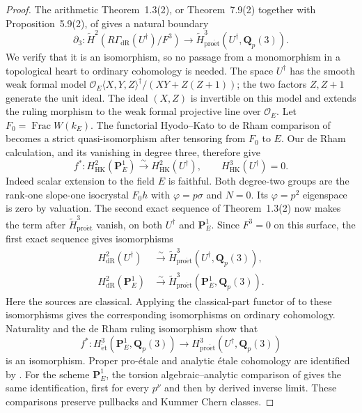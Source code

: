 \documentclass[11pt,a4paper]{amsart}
\numberwithin{equation}{section}
\theoremstyle{definition}
\theoremstyle{remark}
\newcommand{\Q}{\mathbf Q}
\newcommand{\PP}{\mathbf P}
\newcommand{\OO}{\mathcal O}
\newcommand{\Frac}{\operatorname{Frac}}
\begin{document}
\begin{proof}
The arithmetic Theorem~1.3(2), or Theorem~7.9(2) together with Proposition~5.9(2), of \cite{ColmezNiziol} gives a natural boundary
\[
\partial_3:\widetilde H^2(R\Gamma_{\mathrm{dR}}(U^\dagger)/F^3)
\longrightarrow\widetilde H^3_{\mathrm{pro\acute et}}(U^\dagger,\Q_p(3)).
\]
We verify that it is an isomorphism, so no passage from a monomorphism in a topological heart to ordinary cohomology is needed. The space $U^\dagger$ has the smooth weak formal model
$\OO_E\langle X,Y,Z\rangle^\dagger/(XY+Z(Z+1))$; the two factors $Z,Z+1$ generate the unit ideal. The ideal $(X,Z)$ is invertible on this model and extends the ruling morphism to the weak formal projective line over $\OO_E$. Let $F_0=\Frac W(k_E)$. The functorial Hyodo--Kato to de Rham comparison of \cite[equation~(5.4) and Propositions~5.5--5.6]{ColmezNiziol} becomes a strict quasi-isomorphism after tensoring from $F_0$ to $E$. Our de Rham calculation, and its vanishing in degree three, therefore give
\[
f^*:H^2_{\mathrm{HK}}(\PP^1_E)\xrightarrow{\sim}H^2_{\mathrm{HK}}(U^\dagger),
\qquad H^3_{\mathrm{HK}}(U^\dagger)=0.
\]
Indeed scalar extension to the field $E$ is faithful. Both degree-two groups are the rank-one slope-one isocrystal $F_0h$ with $\varphi=p\sigma$ and $N=0$. Its $\varphi=p^2$ eigenspace is zero by valuation. The second exact sequence of Theorem~1.3(2) now makes the term after $\widetilde H^3_{\mathrm{pro\acute et}}$ vanish, on both $U^\dagger$ and $\PP^1_E$. Since $F^3=0$ on this surface, the first exact sequence gives isomorphisms
\begin{align*}
H^2_{\mathrm{dR}}(U^\dagger)&\xrightarrow{\sim}\widetilde H^3_{\mathrm{pro\acute et}}(U^\dagger,\Q_p(3)),\\
H^2_{\mathrm{dR}}(\PP^1_E)&\xrightarrow{\sim}\widetilde H^3_{\mathrm{pro\acute et}}(\PP^1_E,\Q_p(3)).
\end{align*}
Here the sources are classical. Applying the classical-part functor of \cite[Section~3.1.1]{ColmezNiziol} to these isomorphisms gives the corresponding isomorphisms on ordinary cohomology. Naturality and the de Rham ruling isomorphism show that
\[
f^*:H^3_{\mathrm{\acute et}}(\PP^1_E,\Q_p(3))
\longrightarrow H^3_{\mathrm{pro\acute et}}(U^\dagger,\Q_p(3))
\]
is an isomorphism. Proper pro-\'etale and analytic \'etale cohomology
are identified by \cite[Section~7.2.4]{ColmezNiziol}. For the scheme
$\PP^1_E$, the torsion algebraic--analytic comparison of
\cite[Theorem~6.1.1]{BerkovichEtale} gives the same identification,
first for every $p^\nu$ and then by derived inverse limit.
These comparisons preserve pullbacks and Kummer Chern classes.

\end{proof}
\end{document}
